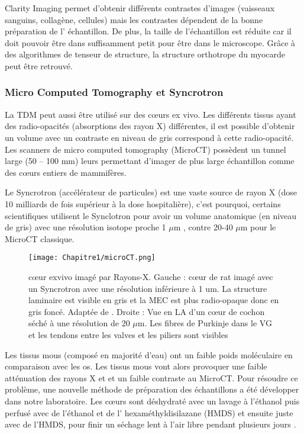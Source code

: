 Clarity Imaging permet d’obtenir différents contrastes d’images (vaisseaux sanguins, collagène, cellules) mais les contrastes dépendent de la bonne préparation de l’ échantillon. De plus, la taille de l’échantillon est réduite car il doit pouvoir être dans suffisamment petit pour être dans le microscope. Grâce à des algorithmes de tenseur de structure, la structure orthotrope du myocarde peut être retrouvé.
\clearpage
\subsubsection{Micro Computed Tomography et Syncrotron}

La TDM peut aussi être utilisé sur des cœurs ex vivo. Les différents tissus ayant des radio-opacités (absorptions des rayon X) différentes, il est possible d’obtenir un volume avec un contraste en niveau de gris correspond à cette radio-opacité. Les scanners de micro computed tomography (MicroCT) possèdent un tunnel large (50 – 100 mm) leurs permettant d’imager de plus large échantillon comme des cœurs entiers de mammifères.

Le Syncrotron (accélérateur de particules) est une vaste source de rayon X (dose 10 milliards de fois supérieur à la dose hospitalière), c’est pourquoi, certains scientifiques utilisent le Synclotron pour avoir un volume anatomique (en niveau de gris) avec une résolution isotope proche 1 $\mu$m \cite{Planinc2021}, contre 20-40 $\mu$m pour le MicroCT classique.

\begin{figure}[!htbp]
  \begin{center}
    \texttt{[image: Chapitre1/microCT.png]}
     \end{center}
    \caption{cœur exvivo imagé par Rayons-X. Gauche : cœur de rat imagé avec un Syncrotron avec une résolution inférieure à 1 um. La structure laminaire est visible en gris et la MEC est plus radio-opaque donc en gris foncé. Adaptée de \cite{Planinc2021}. Droite : Vue en LA d’un cœur de cochon séché à une résolution de 20 $\mu$m. Les fibres de Purkinje dans le VG et les tendons entre les valves et les piliers sont visibles \cite{Pallares_Lupon_2022}}
  \label{fig:uCT}
\end{figure}

Les tissus mous (composé en majorité d’eau) ont un faible poids moléculaire en comparaison avec les os. Les tissus mous vont alors provoquer une faible atténuation des rayons X et et un faible contraste au MicroCT. Pour résoudre ce problème, une nouvelle méthode de préparation des échantillons a été développer dans notre laboratoire. Les cœurs sont déshydraté avec un lavage à l’éthanol puis perfusé avec de l’éthanol et de l’ hexaméthyldisilazane (HMDS) et ensuite juste avec de l’HMDS, pour finir un séchage lent à l’air libre pendant plusieurs jours \cite{Pallares_Lupon_2022}.


